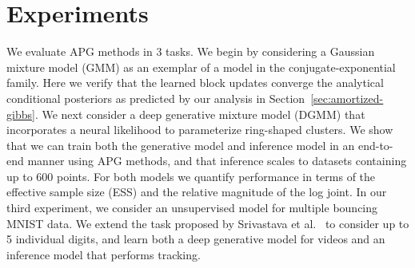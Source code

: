 \documentclass[anonymous=false, %
               format=acmsmall, %
               review=true, %
               screen=true, %
               nonacm=true]{acmart}
\theoremstyle{definition}
\begin{document}

\section{Experiments}
\label{sec:experiments}

We evaluate APG methods in 3 tasks. We begin by considering a Gaussian mixture model (GMM) as an exemplar of a model in the conjugate-exponential family. Here we verify that the learned block updates converge the analytical conditional posteriors as predicted by our analysis in Section~\ref{sec:amortized-gibbs}. We next consider a deep generative mixture model (DGMM) that incorporates a neural likelihood to parameterize ring-shaped clusters. We show that we can train both the generative model and inference model in an end-to-end manner using APG methods, and that inference scales to datasets containing up to 600 points. For both models we quantify performance in terms of the effective sample size (ESS) and the relative magnitude of the log joint. In our third experiment, we consider an unsupervised model for multiple bouncing MNIST data. We extend the task proposed by Srivastava et al.~\cite{srivastava2015unsupervised} to consider up to 5 individual digits, and learn both a deep generative model for videos and an inference model that performs tracking.
\end{document}

